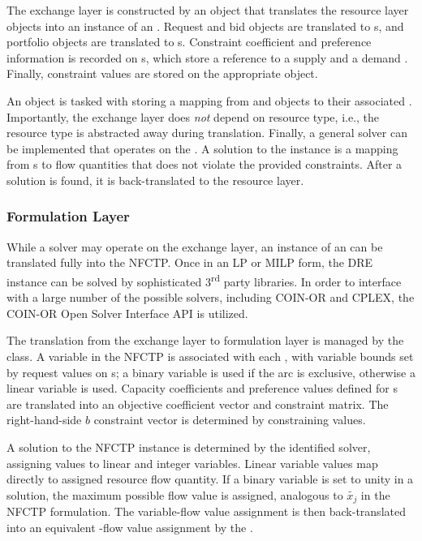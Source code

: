 The exchange layer is constructed by an  object that
translates the resource layer objects into an instance of an
. Request and bid objects are translated to
s, and portfolio objects are translated to
s. Constraint coefficient and preference information is
recorded on s, which store a reference to a supply
 and a demand . Finally, constraint values
are stored on the appropriate  object.

An  object is tasked with storing a mapping from
 and  objects to their associated
. Importantly, the exchange layer does \textit{not} depend on
resource type, i.e., the resource type is abstracted away during
translation. Finally, a general solver can be implemented that operates on the
. A solution to the  instance is a
mapping from s to flow quantities that does not violate the
provided constraints. After a solution is found, it is back-translated to the
resource layer.

\subsubsection{Formulation Layer}

While a solver may operate on the exchange layer, an instance of an
 can be translated fully into the NFCTP. Once in an LP or
MILP form, the DRE instance can be solved by sophisticated 3\textsuperscript{rd}
party libraries. In order to interface with a large number of the possible
solvers, including COIN-OR and CPLEX, the COIN-OR Open Solver Interface API
\cite{coinosi} is utilized.

The translation from the exchange layer to formulation layer is managed by the
 class. A variable in the NFCTP is associated with each
, with variable bounds set by request values on
s; a binary variable is used if the arc is exclusive,
otherwise a linear variable is used. Capacity coefficients and preference values
defined for s are translated into an objective coefficient
vector and constraint matrix. The right-hand-side $b$ constraint vector is
determined by  constraining values.

A solution to the NFCTP instance is determined by the identified solver,
assigning values to linear and integer variables. Linear variable values map
directly to assigned resource flow quantity. If a binary variable is set to
unity in a solution, the maximum possible flow value is assigned, analogous to
$\tilde{x_j}$ in the NFCTP formulation. The variable-flow value assignment is
then back-translated into an equivalent -flow value assignment
by the .

